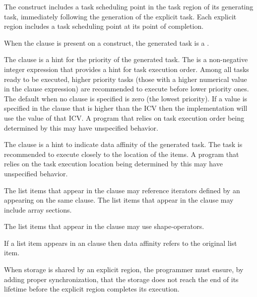 The  construct includes a task scheduling point in the task region of its generating
task, immediately following the generation of the explicit task. Each explicit 
region includes a task scheduling point at its point of completion.

When the  clause is present on a  construct, the generated task is a .

The  clause is a hint for the priority of the generated task. The  is a
non-negative integer expression that provides a hint for task execution order. Among all
tasks ready to be executed, higher priority tasks (those with a higher numerical value in the
 clause expression) are recommended to execute before lower priority ones. The default
 when no  clause is specified is zero (the lowest priority). If a value is
specified in the  clause that is higher than the  ICV then the
implementation will use the value of that ICV. A program that relies on task execution order
being determined by this  may have unspecified behavior.

The  clause is a hint to indicate data affinity of the generated
task. The task is recommended to execute closely to the location of the  items. 
A program that relies on the task execution location
being determined by this  may have unspecified behavior.

The list items that appear in the  clause may reference iterators
defined by an  appearing on the same clause.
The list items that appear in the  clause may include array sections.
\begin{ccppspecific}
The list items that appear in the  clause may use shape-operators.
\end{ccppspecific}

If a list item appears in an  clause then data affinity refers to the original list item.

\begin{note}
When storage is shared by an explicit  region, the
programmer must ensure, by adding proper synchronization, that the storage does not
reach the end of its lifetime before the explicit  region completes its execution.
\end{note}

